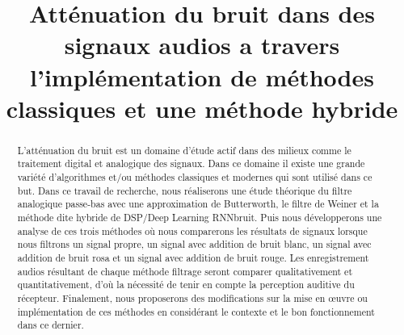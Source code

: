 \documentclass[conference,onecolumn]{IEEEtran}
\begin{document}
\title{Atténuation du bruit dans des signaux audios a travers l’implémentation de méthodes classiques et une méthode hybride\\
}

\author{
\and
{}
\and
{}
}

\maketitle

\begin{abstract}
L’atténuation du bruit est un domaine d’étude actif dans des milieux comme le traitement digital et analogique des signaux. Dans ce domaine il existe une grande variété d’algorithmes et/ou méthodes classiques et modernes qui sont utilisé dans ce but. Dans ce travail de recherche, nous réaliserons une étude théorique du filtre analogique passe-bas avec une approximation de Butterworth, le filtre de Weiner et la méthode dite hybride de DSP/Deep Learning RNNbruit. Puis nous développerons une analyse de ces trois méthodes où nous comparerons les résultats de signaux lorsque nous filtrons un signal propre, un signal avec addition de bruit blanc, un signal avec addition de bruit rosa et un signal avec addition de bruit rouge. Les enregistrement audios résultant de chaque méthode filtrage seront comparer qualitativement et quantitativement, d’où la nécessité de tenir en compte la perception auditive du récepteur. Finalement, nous proposerons des modifications sur la mise en œuvre ou implémentation de ces méthodes en considérant le contexte et le bon fonctionnement dans ce dernier. 
\end{abstract}
\end{document}
